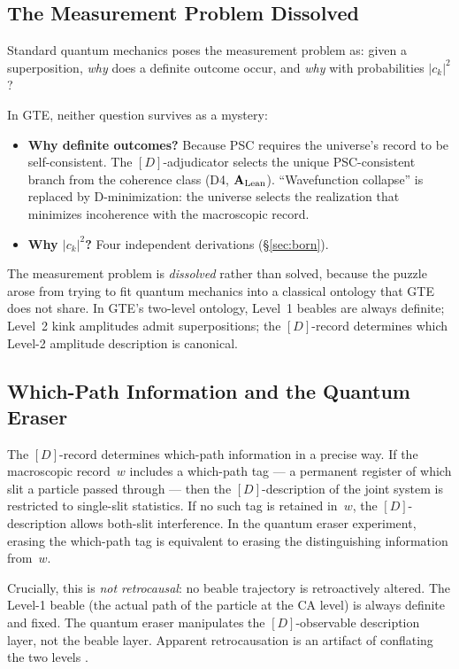 \documentclass[11pt,openany]{book}
\theoremstyle{remark}
\newcommand{\CatAL}{\ensuremath{\textbf{A}_{\rm Lean}}}
\begin{document}
\subsection*{The Measurement Problem Dissolved}

Standard quantum mechanics poses the measurement problem as: given a superposition,
\emph{why} does a definite outcome occur, and \emph{why} with probabilities $|c_k|^2$?

In GTE, neither question survives as a mystery:

\begin{itemize}
\item \textbf{Why definite outcomes?}  Because PSC requires the universe's record to be
  self-consistent.  The $[D]$-adjudicator selects the unique PSC-consistent branch from
  the coherence class (D4, \CatAL).  ``Wavefunction collapse'' is replaced by D-minimization:
  the universe selects the realization that minimizes incoherence with the macroscopic record.

\item \textbf{Why $|c_k|^2$?}  Four independent derivations (§\ref{sec:born}).
\end{itemize}

The measurement problem is \emph{dissolved} rather than solved, because the puzzle
arose from trying to fit quantum mechanics into a classical ontology that GTE does not
share.  In GTE's two-level ontology, Level~1 beables are always definite; Level~2 kink
amplitudes admit superpositions; the $[D]$-record determines which Level-2 amplitude
description is canonical.

\subsection*{Which-Path Information and the Quantum Eraser}

The $[D]$-record determines which-path information in a precise way.  If the macroscopic
record~$w$ includes a which-path tag --- a permanent register of which slit a particle
passed through --- then the $[D]$-description of the joint system is restricted to
single-slit statistics.  If no such tag is retained in~$w$, the $[D]$-description allows
both-slit interference.  In the quantum eraser experiment, erasing the which-path tag
is equivalent to erasing the distinguishing information from~$w$.

Crucially, this is \emph{not retrocausal}: no beable trajectory is retroactively altered.
The Level-1 beable (the actual path of the particle at the CA level) is always definite
and fixed.  The quantum eraser manipulates the $[D]$-observable description layer, not
the beable layer.  Apparent retrocausation is an artifact of conflating the two levels
\cite{SpivackCompleteness}.
\end{document}
